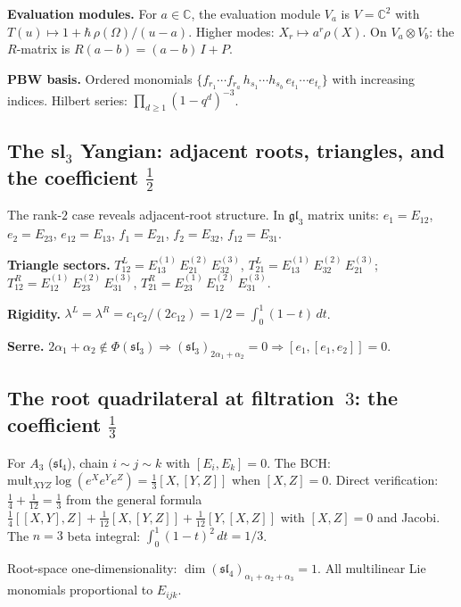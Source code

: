 \documentclass[11pt]{article}
\newcommand{\C}{\mathbb{C}}
\begin{document}
\medskip\noindent\textbf{Evaluation modules.}\enspace
For $a \in \C$, the evaluation module $V_a$ is
$V = \C^2$ with $T(u) \mapsto 1 + \hbar\,\rho(\Omega)/(u-a)$.
Higher modes: $X_r \mapsto a^r \rho(X)$.
On $V_a \otimes V_b$: the $R$-matrix is $R(a{-}b) = (a{-}b)\,I + P$.

\medskip\noindent\textbf{PBW basis.}\enspace
Ordered monomials $\{f_{r_1}\cdots f_{r_a}\,h_{s_1}\cdots h_{s_b}\,
e_{t_1}\cdots e_{t_c}\}$ with increasing indices.
Hilbert series: $\prod_{d \ge 1}(1-q^d)^{-3}$.


\subsection{The sl$_3$ Yangian: adjacent roots, triangles, and the coefficient $\frac12$}

The rank-$2$ case reveals adjacent-root structure.  In $\mathfrak{gl}_3$
matrix units: $e_1 = E_{12}$, $e_2 = E_{23}$, $e_{12} = E_{13}$,
$f_1 = E_{21}$, $f_2 = E_{32}$, $f_{12} = E_{31}$.

\medskip\noindent\textbf{Triangle sectors.}\enspace
$T^L_{12} = E_{13}^{(1)}\,E_{21}^{(2)}\,E_{32}^{(3)}$,
$T^L_{21} = E_{13}^{(1)}\,E_{32}^{(2)}\,E_{21}^{(3)}$;
$T^R_{12} = E_{12}^{(1)}\,E_{23}^{(2)}\,E_{31}^{(3)}$,
$T^R_{21} = E_{23}^{(1)}\,E_{12}^{(2)}\,E_{31}^{(3)}$.

\medskip\noindent\textbf{Rigidity.}\enspace
$\lambda^L = \lambda^R = c_1 c_2/(2c_{12}) = 1/2 = \int_0^1(1-t)\,dt$.

\medskip\noindent\textbf{Serre.}\enspace
$2\alpha_1 + \alpha_2 \notin \Phi(\mathfrak{sl}_3) \Rightarrow
(\mathfrak{sl}_3)_{2\alpha_1+\alpha_2} = 0 \Rightarrow
[e_1,[e_1,e_2]] = 0$.


\subsection{The root quadrilateral at filtration~$3$: the coefficient $\frac13$}

For $A_3$ ($\mathfrak{sl}_4$), chain $i \sim j \sim k$ with
$[E_i, E_k] = 0$.  The BCH: $\mathrm{mult}_{XYZ}\log(e^X e^Y e^Z) =
\frac13[X,[Y,Z]]$ when $[X,Z] = 0$.  Direct verification:
$\frac14 + \frac{1}{12} = \frac13$ from the general formula
$\frac14[[X,Y],Z] + \frac{1}{12}[X,[Y,Z]] + \frac{1}{12}[Y,[X,Z]]$
with $[X,Z] = 0$ and Jacobi.  The $n=3$ beta integral:
$\int_0^1(1-t)^2\,dt = 1/3$.

Root-space one-dimensionality:
$\dim(\mathfrak{sl}_4)_{\alpha_1+\alpha_2+\alpha_3} = 1$.
All multilinear Lie monomials proportional to $E_{ijk}$.
\end{document}

